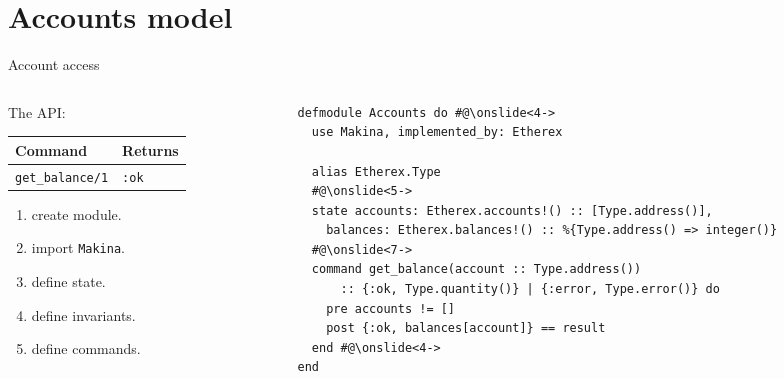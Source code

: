 \documentclass[aspectratio=169, 10pt]{beamer}
\begin{document}
\section{Accounts model}
\label{sec:orgcc7ddb5}
\begin{frame}[label={sec:org9ac53aa},fragile]{Account access}
 \begin{columns}
\begin{column}{0.28\columnwidth}
\onslide<+->
\onslide<+->
The API:

\begin{center}
\begin{tabular}{ll}
Command & Returns\\
\hline
\texttt{get\_balance/1} & \texttt{:ok}\\
\end{tabular}
\end{center}
\onslide<+->
\vspace{0.5cm}
\begin{enumerate}
\item create module.
\onslide<+->
\item import \texttt{Makina}.
\onslide<+->
\item define state.
\onslide<+->
\item define invariants.
\onslide<+->
\item define commands.
\end{enumerate}
\end{column}

\begin{column}{0.68\columnwidth}
\lstset{language=elixir,label= ,caption= ,captionpos=b,numbers=none,style=display}
\begin{lstlisting}
defmodule Accounts do #@\onslide<4->
  use Makina, implemented_by: Etherex

  alias Etherex.Type
  #@\onslide<5->
  state accounts: Etherex.accounts!() :: [Type.address()],
	balances: Etherex.balances!() :: %{Type.address() => integer()}
  #@\onslide<7->
  command get_balance(account :: Type.address())
      :: {:ok, Type.quantity()} | {:error, Type.error()} do
    pre accounts != []
    post {:ok, balances[account]} == result
  end #@\onslide<4->
end
\end{lstlisting}
\end{column}
\end{columns}
\end{frame}
\end{document}
